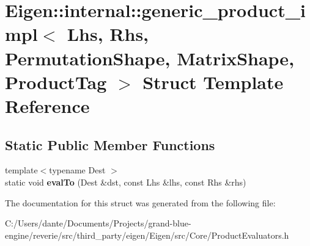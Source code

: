 \hypertarget{struct_eigen_1_1internal_1_1generic__product__impl_3_01_lhs_00_01_rhs_00_01_permutation_shape_00d89930186aaeed972c89117934065103}{}\section{Eigen\+::internal\+::generic\+\_\+product\+\_\+impl$<$ Lhs, Rhs, Permutation\+Shape, Matrix\+Shape, Product\+Tag $>$ Struct Template Reference}
\label{struct_eigen_1_1internal_1_1generic__product__impl_3_01_lhs_00_01_rhs_00_01_permutation_shape_00d89930186aaeed972c89117934065103}
\subsection*{Static Public Member Functions}
\begin{DoxyCompactItemize}
\item 
\mbox{\label{struct_eigen_1_1internal_1_1generic__product__impl_3_01_lhs_00_01_rhs_00_01_permutation_shape_00d89930186aaeed972c89117934065103_ad1539a08692d0f34bfc5677e5400108c}} 
{\footnotesize template$<$typename Dest $>$ }\\static void {\bfseries eval\+To} (Dest \&dst, const Lhs \&lhs, const Rhs \&rhs)
\end{DoxyCompactItemize}


The documentation for this struct was generated from the following file\+:\begin{DoxyCompactItemize}
\item 
C\+:/\+Users/dante/\+Documents/\+Projects/grand-\/blue-\/engine/reverie/src/third\+\_\+party/eigen/\+Eigen/src/\+Core/Product\+Evaluators.\+h\end{DoxyCompactItemize}
